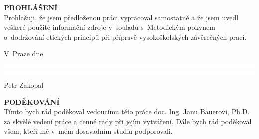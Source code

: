 \documentclass[a4paper, twoside, 11pt]{article}
\begin{document}
\newpage

\newpage




\null\newpage


\null\newpage

\setcounter{page}{5}%

\noindent \textcolor{ctublue}{{\Large{\textbf{\MakeTextUppercase{Prohlášení}}}}}\\
			Prohlašuji, že jsem předloženou práci vypracoval samostatně a že jsem uvedl veškeré použité informační zdroje v~souladu s~Metodickým pokynem o~dodržování etických principů při přípravě vysokoškolských závěrečných prací.\\
		\vspace{1.5cm}
		
	

	\noindent	V~Praze dne \rule{3.5cm}{0.4pt} \hspace{6.6cm}  \rule{4cm}{0.4pt}
	
	\hspace{12.65cm}Petr Zakopal


		\vspace{14cm}
		
	\noindent	\textcolor{ctublue}{{\Large{\textbf{\MakeTextUppercase{Poděkování}}}}}\\
	Tímto bych rád poděkoval vedoucímu této práce doc. Ing. Janu Bauerovi, Ph.D. za skvělé vedení práce a cenné rady při jejím vytváření. Dále bych rád poděkoval všem, kteří mě v~mém dosavadním studiu podporovali.
		


\end{document}
